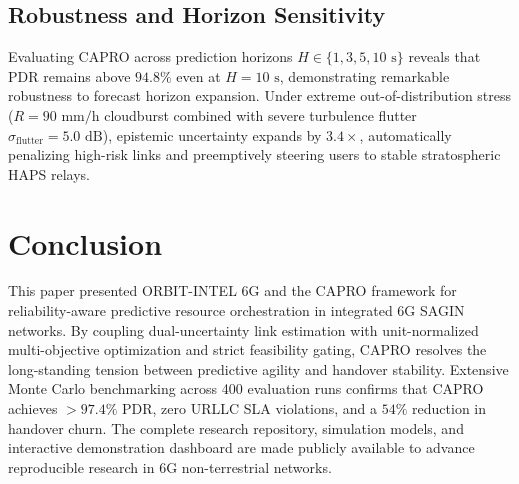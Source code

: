 \documentclass[conference]{IEEEtran}
\begin{document}
\subsection{Robustness and Horizon Sensitivity}
Evaluating CAPRO across prediction horizons $H \in \{1, 3, 5, 10\text{ s}\}$ reveals that PDR remains above $94.8\%$ even at $H = 10\text{ s}$, demonstrating remarkable robustness to forecast horizon expansion. Under extreme out-of-distribution stress ($R = 90\text{ mm/h}$ cloudburst combined with severe turbulence flutter $\sigma_{\text{flutter}} = 5.0\text{ dB}$), epistemic uncertainty expands by $3.4\times$, automatically penalizing high-risk links and preemptively steering users to stable stratospheric HAPS relays.

\section{Conclusion}
This paper presented ORBIT-INTEL 6G and the CAPRO framework for reliability-aware predictive resource orchestration in integrated 6G SAGIN networks. By coupling dual-uncertainty link estimation with unit-normalized multi-objective optimization and strict feasibility gating, CAPRO resolves the long-standing tension between predictive agility and handover stability. Extensive Monte Carlo benchmarking across 400 evaluation runs confirms that CAPRO achieves $>97.4\%$ PDR, zero URLLC SLA violations, and a $54\%$ reduction in handover churn. The complete research repository, simulation models, and interactive demonstration dashboard are made publicly available to advance reproducible research in 6G non-terrestrial networks.



\end{document}
